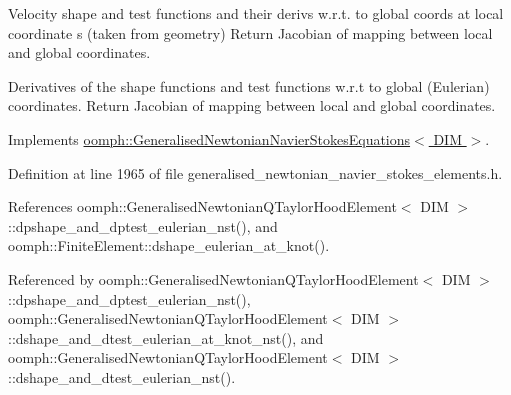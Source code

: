 Velocity shape and test functions and their derivs w.\+r.\+t. to global coords at local coordinate s (taken from geometry) Return Jacobian of mapping between local and global coordinates. 

Derivatives of the shape functions and test functions w.\+r.\+t to global (Eulerian) coordinates. Return Jacobian of mapping between local and global coordinates. 

Implements \hyperlink{classoomph_1_1GeneralisedNewtonianNavierStokesEquations_a20efdbf511d69c1176c6b3df4dfc5fb3}{oomph\+::\+Generalised\+Newtonian\+Navier\+Stokes\+Equations$<$ D\+I\+M $>$}.



Definition at line 1965 of file generalised\+\_\+newtonian\+\_\+navier\+\_\+stokes\+\_\+elements.\+h.



References oomph\+::\+Generalised\+Newtonian\+Q\+Taylor\+Hood\+Element$<$ D\+I\+M $>$\+::dpshape\+\_\+and\+\_\+dptest\+\_\+eulerian\+\_\+nst(), and oomph\+::\+Finite\+Element\+::dshape\+\_\+eulerian\+\_\+at\+\_\+knot().



Referenced by oomph\+::\+Generalised\+Newtonian\+Q\+Taylor\+Hood\+Element$<$ D\+I\+M $>$\+::dpshape\+\_\+and\+\_\+dptest\+\_\+eulerian\+\_\+nst(), oomph\+::\+Generalised\+Newtonian\+Q\+Taylor\+Hood\+Element$<$ D\+I\+M $>$\+::dshape\+\_\+and\+\_\+dtest\+\_\+eulerian\+\_\+at\+\_\+knot\+\_\+nst(), and oomph\+::\+Generalised\+Newtonian\+Q\+Taylor\+Hood\+Element$<$ D\+I\+M $>$\+::dshape\+\_\+and\+\_\+dtest\+\_\+eulerian\+\_\+nst().

\mbox{\label{classoomph_1_1GeneralisedNewtonianQTaylorHoodElement_a8ae9fcfa9a4e9e127dc53a2eb03d3c59}} 
